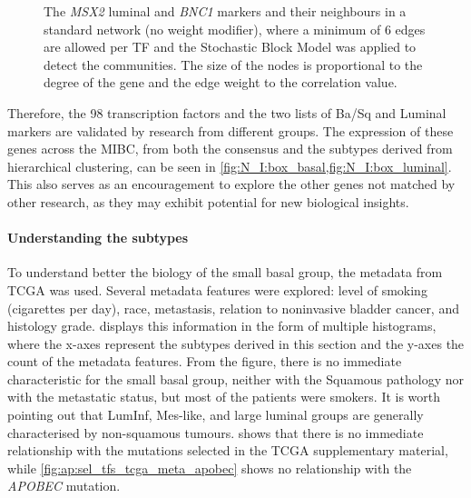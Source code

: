 \begin{figure}[H]
    \caption{The \textit{MSX2} luminal and \textit{BNC1} markers and their neighbours in a standard network (no weight modifier), where a minimum of 6 edges are allowed per TF and the Stochastic Block Model was applied to detect the communities. The size of the nodes is proportional to the degree of the gene and the edge weight to the correlation value.}
    
    \label{fig:N_I:net_neighbours}
\end{figure}



Therefore, the 98 transcription factors and the two lists of Ba/Sq and Luminal markers are validated by research from different groups. The expression of these genes across the MIBC, from both the consensus and the subtypes derived from hierarchical clustering, can be seen in \cref{fig:N_I:box_basal,fig:N_I:box_luminal}. This also serves as an encouragement to explore the other genes not matched by other research, as they may exhibit potential for new biological insights.





\paragraph*{Understanding the subtypes} \label{s:N_I:bio_sel_prun}

To understand better the biology of the small basal group, the metadata from TCGA \citet{Robertson2017-mg} was used. Several metadata features were explored: level of smoking (cigarettes per day), race, metastasis, relation to noninvasive bladder cancer, and histology grade.  displays this information in the form of multiple histograms, where the x-axes represent the subtypes derived in this section and the y-axes the count of the metadata features. From the figure, there is no immediate characteristic for the small basal group, neither with the Squamous pathology nor with the metastatic status, but most of the patients were smokers. It is worth pointing out that LumInf, Mes-like, and large luminal groups are generally characterised by non-squamous tumours.  shows that there is no immediate relationship with the mutations selected in the TCGA supplementary material, while \cref{fig:ap:sel_tfs_tcga_meta_apobec} shows no relationship with the \textit{APOBEC} mutation.

